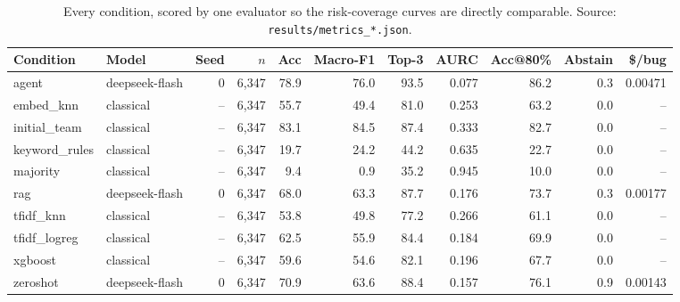 \begin{table}[t]\centering
\caption{Every condition, scored by one evaluator so the risk-coverage curves are directly comparable. Source: \texttt{results/metrics\_*.json}.}
\label{tab:conditions-test2026}
\begin{tabular}{llrrrrrrrrr}
\toprule
Condition & Model & Seed & $n$ & Acc & Macro-F1 & Top-3 & AURC & Acc@80\% & Abstain & \$/bug \\
\midrule
agent & deepseek-flash & 0 & 6{,}347 & 78.9 & 76.0 & 93.5 & 0.077 & 86.2 & 0.3 & 0.00471 \\
embed\_knn & classical & -- & 6{,}347 & 55.7 & 49.4 & 81.0 & 0.253 & 63.2 & 0.0 & -- \\
initial\_team & classical & -- & 6{,}347 & 83.1 & 84.5 & 87.4 & 0.333 & 82.7 & 0.0 & -- \\
keyword\_rules & classical & -- & 6{,}347 & 19.7 & 24.2 & 44.2 & 0.635 & 22.7 & 0.0 & -- \\
majority & classical & -- & 6{,}347 & 9.4 & 0.9 & 35.2 & 0.945 & 10.0 & 0.0 & -- \\
rag & deepseek-flash & 0 & 6{,}347 & 68.0 & 63.3 & 87.7 & 0.176 & 73.7 & 0.3 & 0.00177 \\
tfidf\_knn & classical & -- & 6{,}347 & 53.8 & 49.8 & 77.2 & 0.266 & 61.1 & 0.0 & -- \\
tfidf\_logreg & classical & -- & 6{,}347 & 62.5 & 55.9 & 84.4 & 0.184 & 69.9 & 0.0 & -- \\
xgboost & classical & -- & 6{,}347 & 59.6 & 54.6 & 82.1 & 0.196 & 67.7 & 0.0 & -- \\
zeroshot & deepseek-flash & 0 & 6{,}347 & 70.9 & 63.6 & 88.4 & 0.157 & 76.1 & 0.9 & 0.00143 \\
\bottomrule
\end{tabular}
\end{table}
